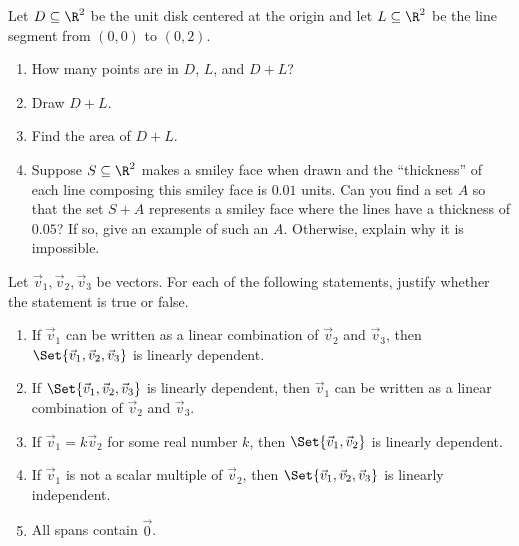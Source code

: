 \begin{exercises}
\begin{problist}
		\prob Let $D\subseteq\R^2$ be the unit disk centered at the origin and let $L\subseteq \R^2$ be
		the line segment from $(0,0)$ to $(0,2)$.
		\begin{enumerate}
			\item How many points are in $D$, $L$, and $D+L$?
			\item Draw $D+L$.
			\item Find the area of $D+L$.
			\item Suppose $S\subseteq\R^2$ makes a smiley face when drawn and the ``thickness'' of
				each line composing this smiley face is $0.01$ units. Can you find a set $A$ so
				that the set $S+A$ represents a smiley face where the lines have a thickness of $0.05$?
				If so, give an example of such an $A$. Otherwise, explain why it is impossible.
		\end{enumerate}

		\prob Let $\vec v_{1}, \vec v_{2}, \vec v_{3}$ be vectors. For each of the following statements,
		justify whether the statement is true or false.
		\begin{enumerate}
			\item If $\vec v_{1}$ can be written as a linear combination
				of $\vec v_{2}$ and $\vec v_{3}$, then $\Set{\vec
				v_1,\vec v_2,\vec v_3}$ is linearly dependent.

			\item If $\Set{\vec v_1,\vec v_2,\vec v_3}$ is linearly dependent,
				then $\vec v_{1}$ can be written as a linear combination
				of $\vec v_{2}$ and $\vec v_{3}$.

			\item If $\vec v_{1}=k\vec v_{2}$ for some real number $k$,
				then $\Set{\vec v_1,\vec v_2}$ is linearly dependent.

			\item If $\vec v_{1}$ is not a scalar multiple of $\vec
				v_{2}$, then $\Set{\vec v_1,\vec v_2,\vec v_3}$ is
				linearly independent.

			\item All spans contain $\vec 0$.
		\end{enumerate}
	\end{problist}
\end{exercises}

